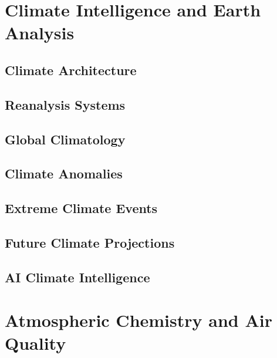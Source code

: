 \documentclass[11pt,a4paper,oneside]{report}
\begin{document}

\part{Climate Intelligence and Earth Analysis}


\chapter{Climate Architecture}



\chapter{Reanalysis Systems}



\chapter{Global Climatology}



\chapter{Climate Anomalies}



\chapter{Extreme Climate Events}



\chapter{Future Climate Projections}



\chapter{AI Climate Intelligence}



\part{Atmospheric Chemistry and Air Quality}
\end{document}
